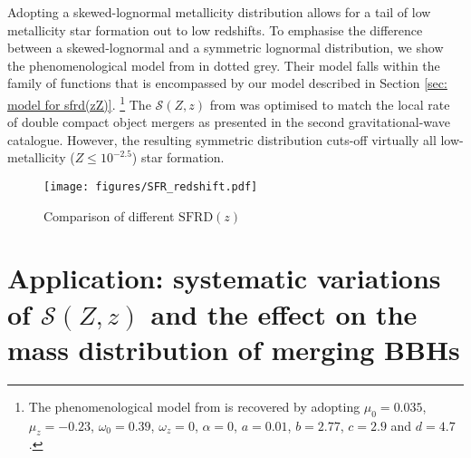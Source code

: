 \documentclass[twocolumn]{aastex631}
\newcommand{\SFRDzZ}{\ensuremath{\mathcal{S}(Z,z)}\xspace}
\newcommand{\SFRDz}{\ensuremath{\mathrm{SFRD}(z)}\xspace}
\begin{document}
Adopting a skewed-lognormal metallicity distribution allows for a tail of low metallicity star formation out to low redshifts. To emphasise the difference between a skewed-lognormal and a symmetric lognormal distribution, we show the phenomenological model from \cite{Neijssel+2019} in dotted grey. Their model falls within the family of functions that is encompassed by our model described in Section \ref{sec: model for sfrd(zZ)}. \footnote{The phenomenological model from \cite{Neijssel+2019} is recovered by adopting $\mu_0= 0.035$, $\mu_z=-0.23$, $\omega_0=0.39 $, $\omega_z = 0$, $\alpha = 0$, $a=0.01$, $b=2.77$, $c=2.9$ and $d=4.7$. }
The \SFRDzZ from \cite{Neijssel+2019} was optimised to match the local rate of double compact object mergers as presented in the second gravitational-wave catalogue. However, the resulting symmetric distribution cuts-off virtually all low-metallicity ($Z\leq 10^{-2.5}$) star formation.


\begin{figure}
\centering
{}
\texttt{[image: figures/SFR\_redshift.pdf]}
\caption{Comparison of different \SFRDz
 \label{fig: SFR(z)}}
\end{figure}



\section{Application: systematic variations of \SFRDzZ and the effect on the mass distribution of merging BBHs \label{sec: mass dists}}

\end{document}
